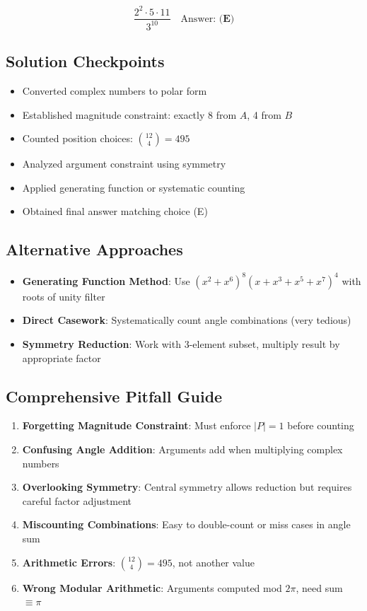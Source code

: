 \documentclass[]{article}
\begin{document}
\begin{solutionbox}
\[\boxed{\frac{2^2 \cdot 5 \cdot 11}{3^{10}}} \quad \text{Answer: } \textbf{(E)}\]

\subsection*{Solution Checkpoints}
\begin{itemize}
    \item[$\square$] Converted complex numbers to polar form
    \item[$\square$] Established magnitude constraint: exactly 8 from $A$, 4 from $B$
    \item[$\square$] Counted position choices: $\binom{12}{4} = 495$
    \item[$\square$] Analyzed argument constraint using symmetry
    \item[$\square$] Applied generating function or systematic counting
    \item[$\square$] Obtained final answer matching choice (E)
\end{itemize}

\subsection*{Alternative Approaches}
\begin{itemize}
    \item \textbf{Generating Function Method}: Use $(x^2 + x^6)^8(x + x^3 + x^5 + x^7)^4$ with roots of unity filter
    \item \textbf{Direct Casework}: Systematically count angle combinations (very tedious)
    \item \textbf{Symmetry Reduction}: Work with 3-element subset, multiply result by appropriate factor
\end{itemize}

\subsection*{Comprehensive Pitfall Guide}
\begin{enumerate}
    \item \textbf{Forgetting Magnitude Constraint}: Must enforce $|P| = 1$ before counting
    \item \textbf{Confusing Angle Addition}: Arguments add when multiplying complex numbers
    \item \textbf{Overlooking Symmetry}: Central symmetry allows reduction but requires careful factor adjustment
    \item \textbf{Miscounting Combinations}: Easy to double-count or miss cases in angle sum
    \item \textbf{Arithmetic Errors}: $\binom{12}{4} = 495$, not another value
    \item \textbf{Wrong Modular Arithmetic}: Arguments computed mod $2\pi$, need sum $\equiv \pi$
\end{enumerate}
\end{solutionbox}
\end{document}
